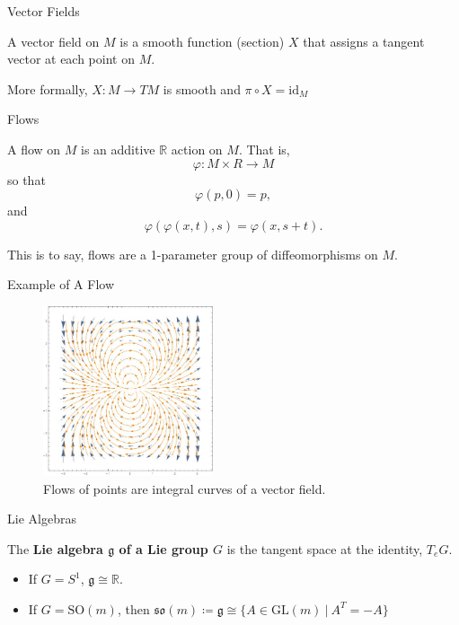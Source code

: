 \documentclass[usenames,dvipsnames]{beamer}
\theoremstyle{definition}
\theoremstyle{theorem}
\newcommand{\R}{\mathbb{R}}
\begin{document}
            \begin{frame}{Vector Fields}
            \begin{definition}
                A vector field on $M$ is a smooth function (section) $X$ that assigns a tangent vector at each point on $M$.
                \vspace{.3cm}
                
                More formally, $X\colon M \to TM$ is smooth and $\pi \circ X = \textrm{id}_M$
            \end{definition}
        \end{frame}
        
        \begin{frame}{Flows}
            \begin{definition}
            A flow on $M$ is an additive $\R$ action on $M$. That is,
            \[
            \varphi \colon M \times R \to M
            \]
            so that
            \[
            \varphi(p,0)=p,
            \]
            and
            \[
            \varphi(\varphi(x,t),s)=\varphi(x,s+t).
            \]
            \end{definition}
            This is to say, flows are a 1-parameter group of diffeomorphisms on $M$.
        \end{frame}
        
        \begin{frame}{Example of A Flow}
            \begin{figure}
                \centering
                \includegraphics[width=5cm]{Topological_Hydrodynamics/flow.jpg}
                \caption{Flows of points are integral curves of a vector field.}
                \label{fig:my_label}
            \end{figure}
        \end{frame}
    
    \begin{frame}{Lie Algebras}
        \begin{definition}
            The \textbf{Lie algebra $\mathfrak{g}$ of a Lie group $G$} is the tangent space at the identity, $T_e G$.
        \end{definition}
        \begin{example}
        \begin{itemize}
            \item If $G=S^1$, $\mathfrak{g}\cong \R$.
            \item If $G=\mathrm{SO}(m)$, then $\mathfrak{so}(m)\coloneqq\mathfrak{g}\cong \{ A \in \mathrm{GL}(m) ~\vert~ A^T=-A\}$
        \end{itemize}
        \end{example}
    \end{frame}
    
\end{document}
